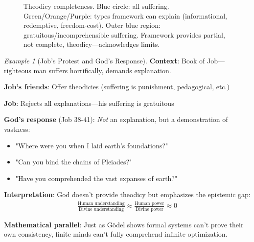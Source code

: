 \documentclass[11pt,a4paper]{article}
\theoremstyle{definition}
\theoremstyle{remark}
\newtheorem{example}{Example}[section]
\begin{document}
\begin{enumerate}
\begin{figure}[H]
\caption{Theodicy completeness. Blue circle: all suffering. Green/Orange/Purple: types framework can explain (informational, redemptive, freedom-cost). Outer blue region: gratuitous/incomprehensible suffering. Framework provides partial, not complete, theodicy—acknowledges limits.}
\label{fig:theodicy_completeness}
\end{figure}

\begin{example}[Job's Protest and God's Response]
\textbf{Context}: Book of Job—righteous man suffers horrifically, demands explanation.

\textbf{Job's friends}: Offer theodicies (suffering is punishment, pedagogical, etc.)

\textbf{Job}: Rejects all explanations—his suffering is gratuitous

\textbf{God's response} (Job 38-41): \textit{Not} an explanation, but a demonstration of vastness:
\begin{itemize}
    \item "Where were you when I laid earth's foundations?"
    \item "Can you bind the chains of Pleiades?"
    \item "Have you comprehended the vast expanses of earth?"
\end{itemize}

\textbf{Interpretation}: God doesn't provide theodicy but emphasizes the epistemic gap:
\begin{align}
\frac{\text{Human understanding}}{\text{Divine understanding}} \approx \frac{\text{Human power}}{\text{Divine power}} \approx 0
\end{align}

\textbf{Mathematical parallel}: Just as Gödel shows formal systems can't prove their own consistency, finite minds can't fully comprehend infinite optimization.


\end{example}
\end{enumerate}
\end{document}
